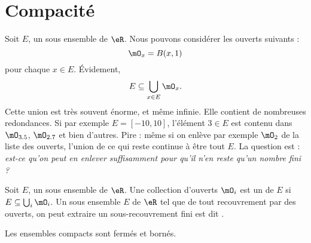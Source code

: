 
\section{Compacité}

Soit $E$, un sous ensemble de $\eR$. Nous pouvons considérer les ouverts suivants : 
\begin{equation}
    \mO_x=B(x,1)
\end{equation}
pour chaque $x\in E$. Évidement,
\begin{equation}
    E\subseteq \bigcup_{x\in E}\mO_x.
\end{equation}
Cette union est très souvent énorme, et même infinie. Elle contient de nombreuses redondances. Si par exemple $E=[-10,10]$, l'élément $3\in E$ est contenu dans $\mO_{3.5}$, $\mO_{2.7}$ et bien d'autres. Pire : même si on enlève par exemple $\mO_2$ de la liste des ouverts, l'union de ce qui reste continue à être tout $E$. La question est : \emph{est-ce qu'on peut en enlever suffisamment pour qu'il n'en reste qu'un nombre fini ?}
\begin{definition}
Soit $E$, un sous ensemble de $\eR$. Une collection d'ouverts $\mO_i$ est un  de $E$ si $E\subseteq \bigcup_{i}\mO_i$. Un sous ensemble $E$ de $\eR$ tel que de tout recouvrement par des ouverts, on peut extraire un sous-recouvrement fini est dit .
\end{definition}

\begin{proposition}
Les ensembles compacts sont fermés et bornés.
\end{proposition}

